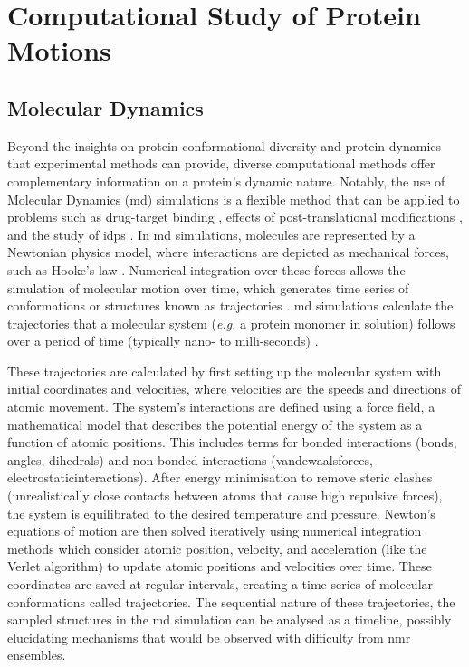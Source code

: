 \section{Computational Study of Protein Motions}
\subsection{Molecular Dynamics}

Beyond the insights on protein conformational diversity and protein \gls{dynamics} that experimental methods can provide, diverse computational methods offer complementary information on a protein's dynamic nature. Notably, the use of Molecular Dynamics (\gls{md}) simulations is a flexible method that can be applied to problems such as drug-target binding \cite{de_vivo_role_2016}, effects of post-translational modifications \cite{sostaric_molecular_2021, bickel_effects_2024}, and the study of \glspl{idp} \cite{shrestha_full_2021}. 
In \gls{md} simulations, molecules are represented by a Newtonian physics model, where interactions are depicted as mechanical forces, such as Hooke's law \cite{adcock_molecular_2006}. Numerical integration over these forces allows the simulation of molecular motion over time, which generates time series of \glspl{conformation} or structures known as trajectories \cite{adcock_molecular_2006}.
\gls{md} simulations calculate the trajectories that a molecular system (\textit{e.g.} a protein monomer in solution) follows over a period of time (typically nano- to milli-seconds) \cite{lindorff-larsen_picosecond_2016}. 

These trajectories are calculated by first setting up the molecular system with initial coordinates and velocities, where velocities are the speeds and directions of atomic movement. The system's interactions are defined using a force field, a mathematical model that describes the potential energy of the system as a function of atomic positions. This includes terms for bonded interactions (bonds, angles, dihedrals) and non-bonded interactions (\gls{vandewaalsforces}, \gls{electrostaticinteractions}). After energy minimisation to remove steric clashes (unrealistically close contacts between atoms that cause high repulsive forces), the system is equilibrated to the desired temperature and pressure. Newton's equations of motion are then solved iteratively using numerical integration methods which consider atomic position, velocity, and acceleration (like the Verlet algorithm) to update atomic positions and velocities over time. These coordinates are saved at regular intervals, creating a time series of molecular \glspl{conformation} called trajectories. The sequential nature of these trajectories, the sampled structures in the \gls{md} simulation can be analysed as a timeline, possibly elucidating mechanisms that would be observed with difficulty from \gls{nmr} ensembles. 

